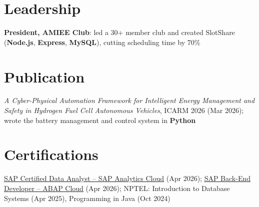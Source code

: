 \documentclass[a4paper,11pt]{article}
\begin{document}
\section{Leadership}
 \begin{itemize}[leftmargin=0.15in, label={}]
    \small{\item{
     \textbf{President, AMIEE Club}: led a 30+ member club and created SlotShare (\textbf{Node.js}, \textbf{Express}, \textbf{MySQL}), cutting scheduling time by 70\%
    }}
 \end{itemize}

\section{Publication}
 \begin{itemize}[leftmargin=0.15in, label={}]
    \small{\item{
     \emph{A Cyber-Physical Automation Framework for Intelligent Energy Management and Safety in Hydrogen Fuel Cell Autonomous Vehicles}, ICARM 2026 (Mar 2026); wrote the battery management and control system in \textbf{Python}
    }}
 \end{itemize}

\section{Certifications}
 \begin{itemize}[leftmargin=0.15in, label={}]
    \small{\item{
     \href{https://www.credly.com/badges/d65af190-177a-41af-9725-942f1a74ce59}{\underline{SAP Certified Data Analyst -- SAP Analytics Cloud}} (Apr 2026); \href{https://www.credly.com/badges/9c20feb9-24ae-4f3f-8358-dce8c76639aa}{\underline{SAP Back-End Developer -- ABAP Cloud}} (Apr 2026); NPTEL: Introduction to Database Systems (Apr 2025), Programming in Java (Oct 2024)
    }}
 \end{itemize}
\end{document}
